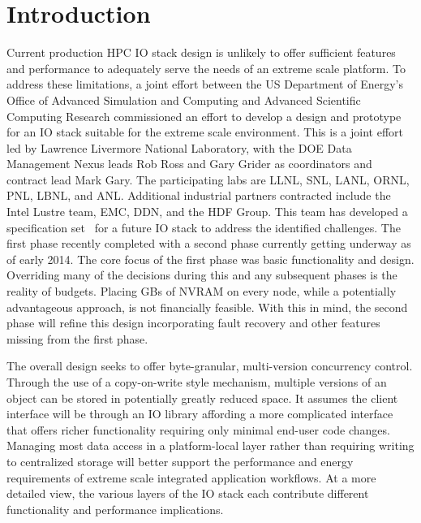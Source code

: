 \documentclass[conference]{IEEEtran}
\begin{document}


\section{Introduction}

Current production HPC IO stack design is unlikely to offer sufficient features
and performance to adequately serve the needs of an extreme scale platform. To
address these limitations, a joint effort between the US Department of Energy's
Office of Advanced Simulation and Computing and Advanced Scientific Computing
Research commissioned an effort to develop a design and prototype for an IO
stack suitable for the extreme scale environment. This is a joint effort led by
Lawrence Livermore National Laboratory, with the DOE Data Management Nexus
leads Rob Ross and Gary Grider as coordinators and contract lead Mark Gary. The
participating labs are LLNL, SNL, LANL, ORNL, PNL, LBNL, and ANL. Additional
industrial partners contracted include the Intel Lustre team, EMC, DDN, and the
HDF Group. This team has developed a specification
set~\cite{fastforward:2014:docs} for a future IO stack to address the
identified challenges. The first phase recently completed with a second phase
currently getting underway as of early 2014. The core focus of the first phase
was basic functionality and design. Overriding many of the decisions during
this and any subsequent phases is the reality of budgets. Placing GBs of NVRAM
on every node, while a potentially advantageous approach, is not financially
feasible. With this in mind, the second phase will refine this design
incorporating fault recovery and other features missing from the first phase.

The overall design seeks to offer byte-granular, multi-version concurrency
control. Through the use of a copy-on-write style mechanism, multiple versions
of an object can be stored in potentially greatly reduced space. It assumes the
client interface will be through an IO library affording a more complicated
interface that offers richer functionality requiring only minimal end-user code
changes.  Managing most data access in a platform-local layer rather than
requiring
writing to centralized storage will better support the performance and energy
requirements of extreme scale integrated application workflows. At a more
detailed view, the various layers of the IO stack each contribute different
functionality and performance implications.
\end{document}
